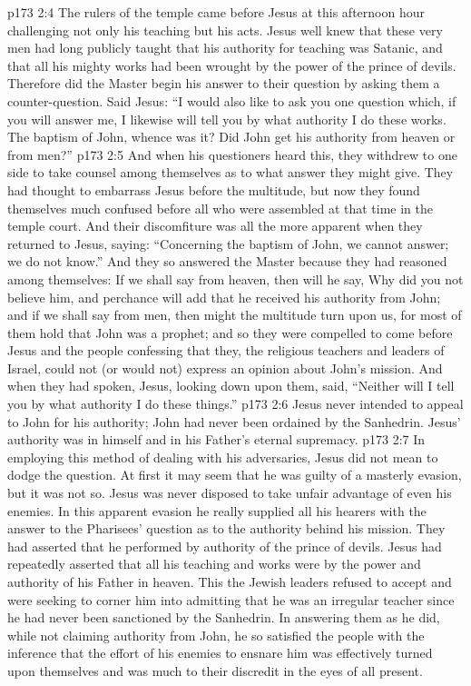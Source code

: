 \vs p173 2:4 The rulers of the temple came before Jesus at this afternoon hour challenging not only his teaching but his acts. Jesus well knew that these very men had long publicly taught that his authority for teaching was Satanic, and that all his mighty works had been wrought by the power of the prince of devils. Therefore did the Master begin his answer to their question by asking them a counter\hyp{}question. Said Jesus: \textcolor{ubdarkred}{“I would also like to ask you one question which, if you will answer me, I likewise will tell you by what authority I do these works. The baptism of John, whence was it? Did John get his authority from heaven or from men?”}
\vs p173 2:5 And when his questioners heard this, they withdrew to one side to take counsel among themselves as to what answer they might give. They had thought to embarrass Jesus before the multitude, but now they found themselves much confused before all who were assembled at that time in the temple court. And their discomfiture was all the more apparent when they returned to Jesus, saying: “Concerning the baptism of John, we cannot answer; we do not know.” And they so answered the Master because they had reasoned among themselves: If we shall say from heaven, then will he say, Why did you not believe him, and perchance will add that he received his authority from John; and if we shall say from men, then might the multitude turn upon us, for most of them hold that John was a prophet; and so they were compelled to come before Jesus and the people confessing that they, the religious teachers and leaders of Israel, could not (or would not) express an opinion about John’s mission. And when they had spoken, Jesus, looking down upon them, said, \textcolor{ubdarkred}{“Neither will I tell you by what authority I do these things.”}
\pc \vs p173 2:6 Jesus never intended to appeal to John for his authority; John had never been ordained by the Sanhedrin. Jesus’ authority was in himself and in his Father’s eternal supremacy.
\vs p173 2:7 In employing this method of dealing with his adversaries, Jesus did not mean to dodge the question. At first it may seem that he was guilty of a masterly evasion, but it was not so. Jesus was never disposed to take unfair advantage of even his enemies. In this apparent evasion he really supplied all his hearers with the answer to the Pharisees’ question as to the authority behind his mission. They had asserted that he performed by authority of the prince of devils. Jesus had repeatedly asserted that all his teaching and works were by the power and authority of his Father in heaven. This the Jewish leaders refused to accept and were seeking to corner him into admitting that he was an irregular teacher since he had never been sanctioned by the Sanhedrin. In answering them as he did, while not claiming authority from John, he so satisfied the people with the inference that the effort of his enemies to ensnare him was effectively turned upon themselves and was much to their discredit in the eyes of all present.
